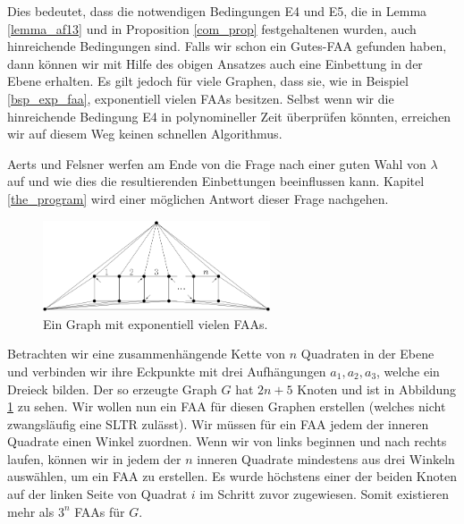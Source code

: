 \begin{remark}
Dies bedeutet, dass die notwendigen Bedingungen E4 und E5, die in Lemma \ref{lemma_af13} und in Proposition \ref{com_prop} festgehaltenen wurden, auch hinreichende Bedingungen sind. Falls wir schon ein Gutes-FAA gefunden haben, dann können wir mit Hilfe des obigen Ansatzes auch eine Einbettung in der Ebene erhalten. Es gilt jedoch für viele Graphen, dass sie, wie in Beispiel \ref{bsp_exp_faa}, exponentiell vielen FAAs besitzen. Selbst wenn wir die hinreichende Bedingung E4 in polynomineller Zeit überprüfen könnten, erreichen wir auf diesem Weg keinen schnellen Algorithmus.
\end{remark}

Aerts und Felsner werfen am Ende von \cite{af13} die Frage nach einer guten Wahl von $\lambda$ auf und wie dies die resultierenden Einbettungen beeinflussen kann. Kapitel \ref{the_program} wird einer möglichen Antwort dieser Frage nachgehen.

\begin{figure}
	\centering
  \includegraphics[width=0.6\textwidth]{exp_faa.png}
  \caption{Ein Graph mit exponentiell vielen FAAs.}
  \label{exp_faa}
\end{figure}

\begin{example}\label{bsp_exp_faa}
Betrachten wir eine zusammenhängende Kette von $n$ Quadraten in der Ebene und verbinden wir ihre Eckpunkte mit drei Aufhängungen $a_1,a_2,a_3$, welche ein Dreieck bilden. Der so erzeugte Graph $G$ hat $2n+5$ Knoten und ist in Abbildung \ref{exp_faa} zu sehen. Wir wollen nun ein FAA für diesen Graphen erstellen (welches nicht zwangsläufig eine SLTR zulässt). Wir müssen für ein FAA jedem der inneren Quadrate einen Winkel zuordnen. Wenn wir von links beginnen und nach rechts laufen, können wir in jedem der $n$ inneren Quadrate mindestens aus drei Winkeln auswählen, um ein FAA zu erstellen. Es wurde höchstens einer der beiden Knoten auf der linken Seite von Quadrat $i$ im Schritt zuvor zugewiesen. Somit existieren mehr als $3^n$ FAAs für $G.$
\end{example}

